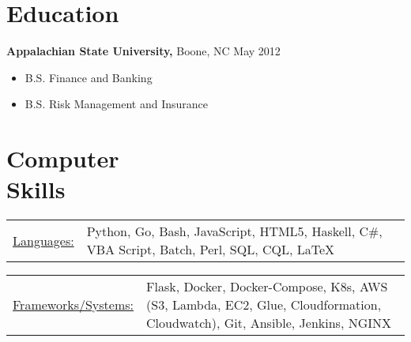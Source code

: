 \documentclass{res}
\begin{document}
\begin{resume}
\section{Education} 
  {\bf Appalachian State University,} Boone, NC \hfill May 2012
    \begin{itemize} \itemsep -2pt
      \item B.S. Finance and Banking
      \item B.S. Risk Management and Insurance
    \end{itemize}

\section{Computer \\ Skills}
   \begin{tabular}{l p{5in}}
    \underline{Languages:} & \raggedright Python, Go, Bash, JavaScript, HTML5, Haskell, C\#, VBA Script, Batch, Perl, SQL, CQL, \LaTeX\\
   \end{tabular}
   \begin{tabular}{l p{5in}}
       \underline{Frameworks/Systems:} & \raggedright Flask, Docker, Docker-Compose, K8s, AWS (S3, Lambda, EC2, Glue, Cloudformation, Cloudwatch), Git, Ansible, Jenkins, NGINX
 \end{tabular}
\end{resume} 
\end{document}
